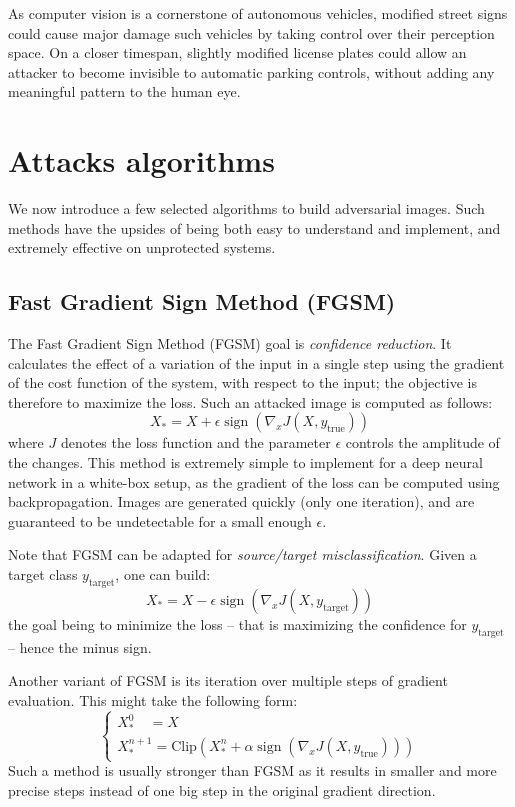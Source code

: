 \documentclass[twocolumn]{../../cs-classes/cs-classes}
\DeclareMathOperator*{\sign}{sign}
\begin{document}
As computer vision is a cornerstone of autonomous vehicles, modified street signs could cause major damage such vehicles by taking control over their perception space. On a closer timespan, slightly modified license plates could allow an attacker to become invisible to automatic parking controls, without adding any meaningful pattern to the human eye.


\section{Attacks algorithms}
\label{sec:attacks-algorithms}
We now introduce a few selected algorithms to build adversarial images. Such methods have the upsides of being both easy to understand and implement, and extremely effective on unprotected systems.

\subsection{Fast Gradient Sign Method (FGSM)}
The Fast Gradient Sign Method (FGSM) goal is \emph{confidence reduction}. It calculates the effect of a variation of the input in a single step using the gradient of the cost function of the system, with respect to the input; the objective is therefore to maximize the loss. Such an attacked image is computed as follows:
\begin{equation*}
    X_* = X + \epsilon\sign\left(\nabla_x J(X, y_{\text{true}})\right)
\end{equation*}
where $J$ denotes the loss function and the parameter $\epsilon$ controls the amplitude of the changes.
This method is extremely simple to implement for a deep neural network in a white-box setup, as the gradient of the loss can be computed using backpropagation. Images are generated quickly (only one iteration), and are guaranteed to be undetectable for a small enough $\epsilon$.

Note that FGSM can be adapted for \emph{source/target misclassification}. Given a target class $y_{\text{target}}$, one can build:
\begin{equation*}
    X_* = X - \epsilon\sign\left(\nabla_x J(X, y_{\text{target}})\right)
\end{equation*}
the goal being to minimize the loss -- that is maximizing the confidence for $y_{\text{target}}$ -- hence the minus sign.

Another variant of FGSM is its iteration over multiple steps of gradient evaluation. This might take the following form:
\begin{equation*}
    \begin{cases*}
        X_*^0 \quad= X\\
        X^{n+1}_* = \text{Clip}\left(X^n_*+\alpha\sign\left(\nabla_x J(X, y_{\text{true}})\right)\right)
    \end{cases*}
\end{equation*}
Such a method is usually stronger than FGSM as it results in smaller and more precise steps instead of one big step in the original gradient direction.
\end{document}
